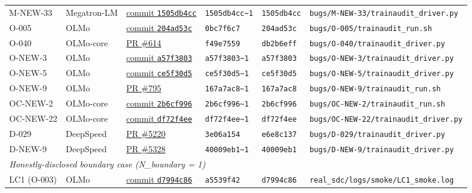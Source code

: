 \begin{table}[t]
\begin{tabular}{@{}l l l l l l@{}}
M-NEW-33 & Megatron-LM & \href{https://github.com/NVIDIA/Megatron-LM/commit/1505db4cc}{commit \texttt{1505db4cc}} & \texttt{1505db4cc\textasciitilde 1}   & \texttt{1505db4cc}     & \texttt{bugs/M-NEW-33/trainaudit\_driver.py} \\
O-005    & OLMo        & \href{https://github.com/allenai/OLMo/commit/204ad53c}{commit \texttt{204ad53c}}  & \texttt{0bc7f6c7}                     & \texttt{204ad53c}      & \texttt{bugs/O-005/trainaudit\_run.sh} \\
O-040    & OLMo-core   & \href{https://github.com/allenai/OLMo-core/pull/614}{PR \#614}               & \texttt{f49e7559}                     & \texttt{db2b6eff}      & \texttt{bugs/O-040/trainaudit\_driver.py} \\
O-NEW-3  & OLMo        & \href{https://github.com/allenai/OLMo/commit/a57f3803}{commit \texttt{a57f3803}}  & \texttt{a57f3803\textasciitilde 1}    & \texttt{a57f3803}      & \texttt{bugs/O-NEW-3/trainaudit\_driver.py} \\
O-NEW-5  & OLMo        & \href{https://github.com/allenai/OLMo/commit/ce5f30d5}{commit \texttt{ce5f30d5}}  & \texttt{ce5f30d5\textasciitilde 1}    & \texttt{ce5f30d5}      & \texttt{bugs/O-NEW-5/trainaudit\_driver.py} \\
O-NEW-9  & OLMo        & \href{https://github.com/allenai/OLMo/pull/795}{PR \#795}                    & \texttt{167a7ac8\textasciitilde 1}    & \texttt{167a7ac8}      & \texttt{bugs/O-NEW-9/trainaudit\_run.sh} \\
OC-NEW-2 & OLMo-core   & \href{https://github.com/allenai/OLMo-core/commit/2b6cf996}{commit \texttt{2b6cf996}} & \texttt{2b6cf996\textasciitilde 1}    & \texttt{2b6cf996}      & \texttt{bugs/OC-NEW-2/trainaudit\_run.sh} \\
OC-NEW-22& OLMo-core   & \href{https://github.com/allenai/OLMo-core/commit/df72f4ee}{commit \texttt{df72f4ee}} & \texttt{df72f4ee\textasciitilde 1}    & \texttt{df72f4ee}      & \texttt{bugs/OC-NEW-22/trainaudit\_driver.py} \\
D-029    & DeepSpeed   & \href{https://github.com/microsoft/DeepSpeed/pull/5220}{PR \#5220}           & \texttt{3e06a154}                     & \texttt{e6e8c137}      & \texttt{bugs/D-029/trainaudit\_driver.py} \\
D-NEW-9  & DeepSpeed   & \href{https://github.com/microsoft/DeepSpeed/pull/5328}{PR \#5328}           & \texttt{40009eb1\textasciitilde 1}    & \texttt{40009eb1}      & \texttt{bugs/D-NEW-9/trainaudit\_driver.py} \\
\midrule
\multicolumn{6}{l}{\textit{Honestly-disclosed boundary case (N\_boundary = 1)}} \\
LC1 (O-003) & OLMo & \href{https://github.com/allenai/OLMo/commit/d7994c86}{commit \texttt{d7994c86}} & \texttt{a5539f42} & \texttt{d7994c86} & \texttt{real\_sdc/logs/smoke/LC1\_smoke.log} \\
\bottomrule
\end{tabular}
\end{table}

